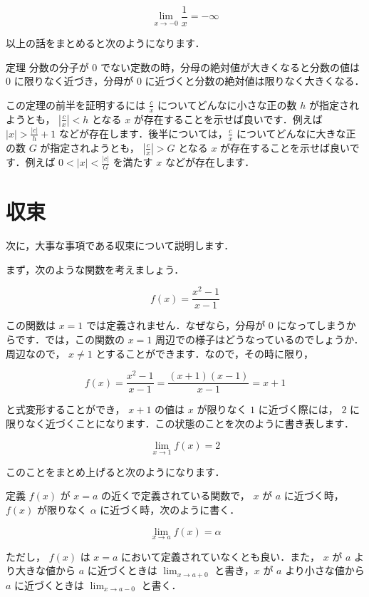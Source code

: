 \documentclass[
  b4paperpaper,
  xelatex,ja=standard]{bxjsbook}
\begin{document}
\[ \lim_{x\to -0}\frac{1}{x}=-\infty\]

以上の話をまとめると次のようになります．

\begin{Tbox}{定理}
分数の分子が \(0\) でない定数の時，分母の絶対値が大きくなると分数の値は
\(0\) に限りなく近づき，分母が \(0\)
に近づくと分数の絶対値は限りなく大きくなる．

\end{Tbox}

この定理の前半を証明するには \(\frac{c}{x}\)
についてどんなに小さな正の数 \(h\) が指定されようとも，
\(|\frac{c}{x}|<h\) となる \(x\) が存在することを示せば良いです．例えば
\(|x|>\frac{|c|}{h}+1\)
などが存在します．後半については，\(\frac{c}{x}\)
についてどんなに大きな正の数 \(G\) が指定されようとも，
\(|\frac{c}{x}| > G\) となる \(x\)
が存在することを示せば良いです．例えば \(0<|x|<\frac{|c|}{G}\) を満たす
\(x\) などが存在します．

\hypertarget{ux53ceux675f}{%
\section{収束}\label{ux53ceux675f}}

次に，大事な事項である収束について説明します．

まず，次のような関数を考えましょう．

\[f(x) = \frac{x^2-1}{x-1}\]

この関数は \(x=1\) では定義されません．なぜなら，分母が \(0\)
になってしまうからです．では，この関数の \(x=1\)
周辺での様子はどうなっているのでしょうか．周辺なので， \(x\neq 1\)
とすることができます．なので，その時に限り，

\[f(x) = \frac{x^2-1}{x-1}=\frac{(x+1)(x-1)}{x-1}=x+1\]

と式変形することができ， \(x+1\) の値は \(x\) が限りなく \(1\)
に近づく際には， \(2\)
に限りなく近づくことになります．この状態のことを次のように書き表します．

\[ \lim_{x\to 1}f(x)=2\]

このことをまとめ上げると次のようになります．

\begin{Dbox}{定義}
\(f(x)\) が \(x=a\) の近くで定義されている関数で， \(x\) が \(a\)
に近づく時，\(f(x)\) が限りなく \(\alpha\) に近づく時，次のように書く．

\[ \lim_{x\to a}f(x)=\alpha\]

ただし， \(f(x)\) は \(x=a\) において定義されていなくとも良い．また，
\(x\) が \(a\) より大きな値から \(a\) に近づくときは \(\lim_{x\to a+0}\)
と書き，\(x\) が \(a\) より小さな値から \(a\) に近づくときは
\(\lim_{x\to a-0}\) と書く．

\end{Dbox}
\end{document}
